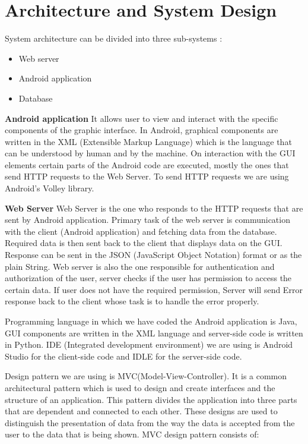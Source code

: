 \chapter{Architecture and System Design}

System architecture can be divided into three sub-systems :
\begin{itemize}
	\item 	 Web server
	\item 	 Android application
	\item 	 Database
\end{itemize}

\textbf{Android application}
It allows user to view and interact with the specific components of the graphic interface. In Android, graphical components are written in the XML (Extensible Markup Language) which is the language that can be understood by human and by the machine. On interaction with the GUI elements certain parts of the Android code are executed, mostly the ones that send HTTP requests to the Web Server. To send HTTP requests we are using Android’s Volley library.

\textbf{Web Server}
Web Server is the one who responds to the HTTP requests that are sent by Android application. Primary task of the web server is communication with the client (Android application) and fetching data from the database. Required data is then sent back to the client that displays data on the GUI. Response can be sent in the JSON (JavaScript Object Notation) format or as the plain String. Web server is also the one responsible for authentication and authorization of the user, server checks if the user has permission to access the certain data. If user does not have the required permission, Server will send Error response back to the client whose task is to handle the error properly.

Programming language in which we have coded the Android application is Java, GUI components are written in the XML language and server-side code is written in Python. IDE (Integrated development environment) we are using is Android Studio for the client-side code and IDLE for the server-side code.

Design pattern we are using is MVC(Model-View-Controller). It is a common architectural pattern which is used to design and create interfaces and the structure of an application. This pattern divides the application into three parts that are dependent and connected to each other. These designs are used to distinguish the presentation of data from the way the data is accepted from the user to the data that is being shown. 
MVC design pattern consists of: 

